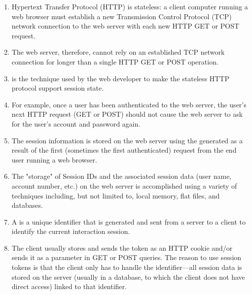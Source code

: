 \begin{enumerate}
\item 
Hypertext Transfer Protocol (HTTP) is stateless: a client computer
running a web browser must establish a new Transmission Control
Protocol (TCP) network connection to the web server with each new
HTTP GET or POST request. 

\item 
The web server, therefore, cannot rely
on an established TCP network connection for longer than a single
HTTP GET or POST operation. 

\item 
{} is the technique
used by the web developer to make the stateless HTTP protocol support
session state. 

\item 
For example, once a user has been authenticated to
the web server, the user's next HTTP request (GET or POST) should
not cause the web server to ask for the user's account and password
again. 

\item 
The session information is stored on the web server using the 
generated as a result of the first (sometimes
the first authenticated) request from the end user running a web
browser. 

\item 
The "storage" of Session IDs and the associated session
data (user name, account number, etc.) on the web server is
accomplished using a variety of techniques including, but not limited
to, local memory, flat files, and databases.

\item 
A  is a unique identifier that is generated and sent
from a server to a client to identify the current interaction
session. 

\item 
The client usually stores and sends the token as an HTTP
cookie and/or sends it as a parameter in GET or POST queries. The
reason to use session tokens is that the client only has to handle
the identifier—all session data is stored on the server (usually
in a database, to which the client does not have direct access)
linked to that identifier. 
\end{enumerate}


